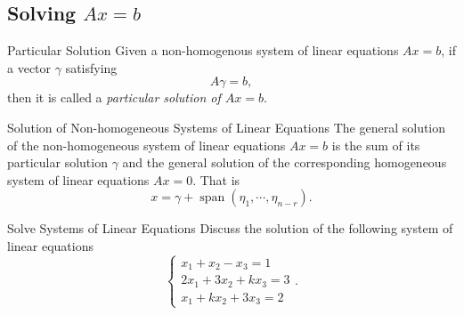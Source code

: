 \subsection{Solving $Ax = b$}

\begin{definition}{Particular Solution}{}
  Given a non-homogenous system of linear equations $Ax = b$,
  if a vector $\gamma$ satisfying 
  \begin{equation}
    A \gamma = b,
  \end{equation}
  then it is called a \emph{particular solution of $Ax = b$}.
\end{definition}

\begin{proposition}{Solution of Non-homogeneous Systems of Linear Equations}{}
  The general solution of the non-homogeneous system of linear equations $Ax = b$
  is the sum of its particular solution $\gamma$ and the general solution of
  the corresponding homogeneous system of linear equations $Ax = 0$.
  That is
  \begin{equation}
    x = \gamma + \operatorname{span} (\eta_1,\cdots,\eta_{n-r}).
  \end{equation}
\end{proposition}

\begin{example}{Solve Systems of Linear Equations}{}
 Discuss the solution of the following system of linear equations 
 \begin{equation}
   \begin{cases}
     x_1 + x_2 - x_3 = 1\\
     2x_1 + 3x_2 + kx_3 = 3\\
     x_1 + kx_2 + 3x_3 = 2
   \end{cases}.
 \end{equation}
\end{example}

